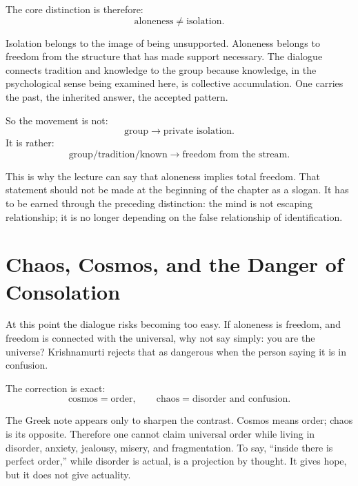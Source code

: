 The core distinction is therefore:
\begin{equation}
\text{aloneness} \neq \text{isolation}.
\end{equation}

Isolation belongs to the image of being unsupported. Aloneness belongs to freedom from the structure that has made support necessary. The dialogue connects tradition and knowledge to the group because knowledge, in the psychological sense being examined here, is collective accumulation. One carries the past, the inherited answer, the accepted pattern.

So the movement is not:
\begin{equation}
\text{group} \longrightarrow \text{private isolation}.
\end{equation}
It is rather:
\begin{equation}
\text{group/tradition/known}
\longrightarrow
\text{freedom from the stream}.
\end{equation}

This is why the lecture can say that aloneness implies total freedom. That statement should not be made at the beginning of the chapter as a slogan. It has to be earned through the preceding distinction: the mind is not escaping relationship; it is no longer depending on the false relationship of identification.

\section{Chaos, Cosmos, and the Danger of Consolation}

At this point the dialogue risks becoming too easy. If aloneness is freedom, and freedom is connected with the universal, why not say simply: you are the universe? Krishnamurti rejects that as dangerous when the person saying it is in confusion.

The correction is exact:
\begin{equation}
\text{cosmos} = \text{order},
\qquad
\text{chaos} = \text{disorder and confusion}.
\end{equation}

The Greek note appears only to sharpen the contrast. Cosmos means order; chaos is its opposite. Therefore one cannot claim universal order while living in disorder, anxiety, jealousy, misery, and fragmentation. To say, ``inside there is perfect order,'' while disorder is actual, is a projection by thought. It gives hope, but it does not give actuality.

